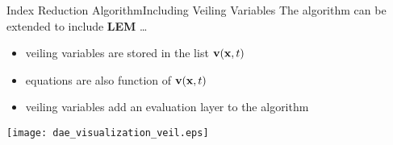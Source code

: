 \begin{frame}{Index Reduction Algorithm}{Including Veiling Variables}
  \vspace{-1.0em}
  The algorithm can be extended to include \textbf{\acs{LEM}} \dots
  \begin{itemize}
    \item veiling variables are stored in the list $\mathbf{v}(\mathbf{x}, t)$
    \item equations are also function of $\mathbf{v}(\mathbf{x}, t)$
    \item veiling variables add an evaluation layer to the algorithm
  \end{itemize}
  \vspace{-1.5em}\hspace{-0.025\textwidth}\texttt{[image: dae\_visualization\_veil.eps]}
\end{frame}


